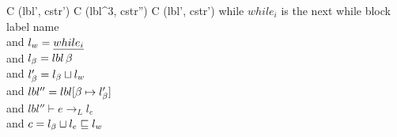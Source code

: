\begin{trules}
        { {C} {(lbl', cstr')} }
        { {C} {(lbl^3, cstr'')} \;
          {C} {(lbl', cstr')} }
        {while $while_i$ is the next while block label name\\
          and $l_w = \underline{while_i}$\\
          and $l_\beta = lbl \, \beta$\\
          and $l_\beta' = l_\beta \sqcup l_w$\\
          and $lbl'' = lbl[\beta \mapsto l_\beta']$\\
          and $lbl'' \vdash e \rightarrow_L l_e$\\
          and $c = l_\beta \sqcup l_e \sqsubseteq l_w$}
\end{trules}
